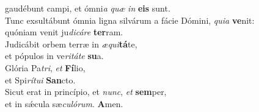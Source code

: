 \oddverse gaudébunt campi, et ómni\textit{a} \textit{quæ} \textit{in} \textbf{e}\textbf{is} sunt.\\
\evenverse Tunc exsultábunt ómnia ligna silvárum a fácie Dómini, \textit{qui}\textit{a} \textbf{ve}nit:~\*\\
\evenverse quóniam venit ju\textit{di}\textit{cá}\textit{re} \textbf{ter}ram.\\
\oddverse Judicábit orbem terræ in \textit{æ}\textit{qui}\textbf{tá}te,~\*\\
\oddverse et pópulos in ve\textit{ri}\textit{tá}\textit{te} \textbf{su}a.\\
\evenverse Glória Pa\textit{tri}, \textit{et} \textbf{Fí}lio,~\*\\
\evenverse et Spi\textit{rí}\textit{tu}\textit{i} \textbf{San}cto.\\
\oddverse Sicut erat in princípio, et \textit{nunc}, \textit{et} \textbf{sem}per,~\*\\
\oddverse et in sǽcula sæ\textit{cu}\textit{ló}\textit{rum}. \textbf{A}men.\\
